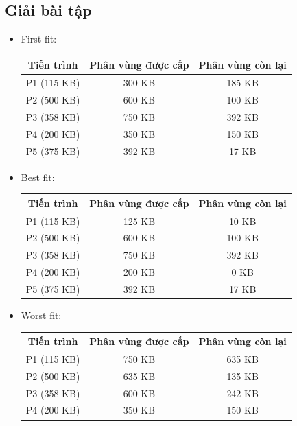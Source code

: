 \documentclass[12pt, letterpaper]{article}
\begin{document}
\subsection{Giải bài tập}
\begin{itemize}
    \item First fit:
    \begin{table}[H]
    \centering
    \begin{tabular}{c|c|c}
    \toprule
    \textbf{Tiến trình} & \textbf{Phân vùng được cấp} & \textbf{Phân vùng còn lại} \\
    \midrule
    P1 (115 KB) & 300 KB & 185 KB \\
    P2 (500 KB) & 600 KB & 100 KB \\
    P3 (358 KB) & 750 KB & 392 KB \\
    P4 (200 KB) & 350 KB & 150 KB \\
    P5 (375 KB) & 392 KB & 17 KB \\
    \bottomrule
    \end{tabular}
    \end{table}
    \item Best fit:
    \begin{table}[H]
    \centering
    \begin{tabular}{c|c|c}
    \toprule
    \textbf{Tiến trình} & \textbf{Phân vùng được cấp} & \textbf{Phân vùng còn lại} \\
    \midrule
    P1 (115 KB) & 125 KB & 10 KB \\
    P2 (500 KB) & 600 KB & 100 KB \\
    P3 (358 KB) & 750 KB & 392 KB \\
    P4 (200 KB) & 200 KB & 0 KB \\
    P5 (375 KB) & 392 KB & 17 KB \\
    \bottomrule
    \end{tabular}
    \end{table}
    \item Worst fit:
    \begin{table}[H]
    \centering
    \begin{tabular}{c|c|c}
    \toprule
    \textbf{Tiến trình} & \textbf{Phân vùng được cấp} & \textbf{Phân vùng còn lại} \\
    \midrule
    P1 (115 KB) & 750 KB & 635 KB \\
    P2 (500 KB) & 635 KB & 135 KB \\
    P3 (358 KB) & 600 KB & 242 KB \\
    P4 (200 KB) & 350 KB & 150 KB \\

\end{tabular}
\end{table}
\end{itemize}
\end{document}
